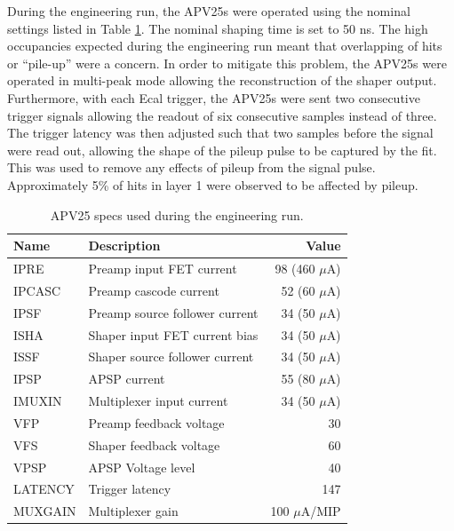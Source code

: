 During the engineering run, the APV25s were operated using the nominal settings
listed in Table \ref{tab:apv_specs}.  The nominal shaping time is set
to 50 ns.  The high occupancies expected during the engineering
run meant that overlapping of hits or ``pile-up'' were a concern.  In order to 
mitigate this problem, the APV25s were operated in multi-peak mode allowing 
the reconstruction of the shaper output.  Furthermore, 
with each Ecal trigger, the APV25s were sent two consecutive trigger signals 
allowing the readout of six consecutive samples instead of three.  The trigger
latency was then adjusted such that two samples before the signal were read out, 
allowing the shape of the pileup pulse to be captured by the fit.  This was 
used to remove any effects of pileup from the signal pulse.  Approximately 5\%
of hits in layer 1 were observed to be affected by pileup.
\begin{table}[ht]
    \centering
    \begin{tabular}{llr}
        \toprule
        \textbf{Name} & \textbf{Description} & \textbf{Value} \\
        \midrule
        \midrule
        IPRE   & Preamp input FET current       & 98 (460 $\mu$A)\\
        IPCASC & Preamp cascode current         & 52 (60 $\mu$A) \\
        IPSF   & Preamp source follower current & 34 (50 $\mu$A) \\
        ISHA   & Shaper input FET current bias  & 34 (50 $\mu$A) \\
        ISSF   & Shaper source follower current & 34 (50 $\mu$A) \\
        IPSP   & APSP current                   & 55 (80 $\mu$A) \\
        IMUXIN & Multiplexer input current      & 34 (50 $\mu$A) \\
        VFP    & Preamp feedback voltage        & 30  \\
        VFS    & Shaper feedback voltage        & 60  \\
        VPSP   & APSP Voltage level             & 40  \\
        LATENCY & Trigger latency               & 147 \\
        MUXGAIN & Multiplexer gain              & 100 $\mu$A/MIP \\
        \bottomrule
    \end{tabular}
    \caption{APV25 specs used during the engineering run.}
    \label{tab:apv_specs}
\end{table}

